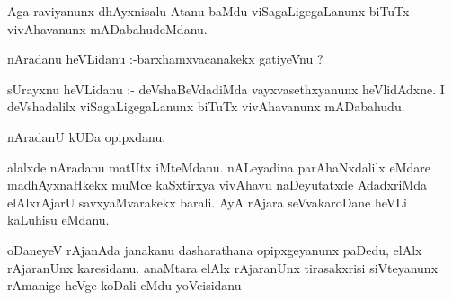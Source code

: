 \documentclass{article}
\begin{document}
\begin{mn}
Aga  raviyanunx  dhAyxnisalu  Atanu  baMdu  viSagaLigegaLanunx  biTuTx  vivAhavanunx  mADabahudeMdanu.
\end{mn}

\begin{mn}
nAradanu  heVLidanu :-barxhamxvacanakekx  gatiyeVnu ?
\end{mn}

\begin{mn}
sUrayxnu  heVLidanu :- deVshaBeVdadiMda  vayxvasethxyanunx  heVlidAdxne.  I  deVshadalilx  viSagaLigegaLanunx  biTuTx  vivAhavanunx  mADabahudu.  
\end{mn}

\begin{mn}
nAradanU  kUDa  opipxdanu.
\end{mn}

\begin{mn}
alalxde  nAradanu  matUtx  iMteMdanu.   nALeyadina  parAhaNxdalilx  eMdare  madhAyxnaHkekx  muMce  kaSxtirxya  vivAhavu  naDeyutatxde  
AdadxriMda  elAlxrAjarU  savxyaMvarakekx  barali.  AyA  rAjara  seVvakaroDane  heVLi kaLuhisu  eMdanu.
\end{mn}

\begin{mn}
oDaneyeV  rAjanAda  janakanu  dasharathana  opipxgeyanunx  paDedu,  elAlx  rAjaranUnx  karesidanu.  anaMtara  elAlx  rAjaranUnx  
tirasakxrisi  siVteyanunx  rAmanige  heVge  koDali  eMdu  yoVcisidanu
\end{mn}
\end{document}
